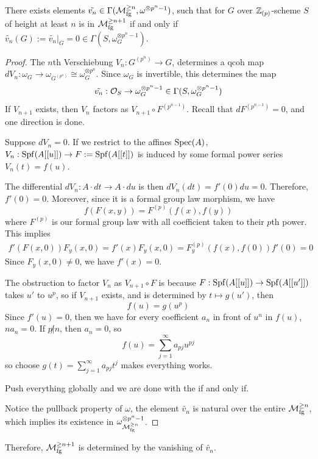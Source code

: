 \begin{proposition}
    There exists elements $\tilde{v_n}\in \Gamma(\mathcal{M}_{\mathrm{fg}}^{\geq n}, \omega^{\otimes p^n-1})$,
    such that for $G$ over $\mathbb{Z}_{(p)}$-scheme $S$ of height at least $n$ is in $\mathcal{M}_{\mathrm{fg}}^{\geq n+1}$ if and only if $\tilde{v_n}(G):=\tilde{v_n}|_{G}=0\in \Gamma(S, \omega_G^{\otimes p^n-1})$.
\end{proposition}
\begin{proof}
The $n$th Verschiebung $V_n: G^{(p^n)}\to G$, determines a qcoh map $dV_n: \omega_G\to \omega_{G^{(p^n)}}\cong \omega_G^{\otimes p^n}$. Since $\omega_G$ is invertible, this determines the map 
\[
\tilde{v_n}: \mathcal{O}_S\to \omega_G^{\otimes p^n-1}\in \Gamma(S, \omega_G^{\otimes p^n-1})
\]
If $V_{n+1}$ exists, then $V_n$ factors as $V_{n+1}\circ F^{(p^{n-1})}$. Recall that $dF^{(p^{n-1})}=0$, and one direction is done.

Suppose $dV_n=0$. If we restrict to the affines $\operatorname{\mathrm{Spec}}(A)$, $V_n: \operatorname{\mathrm{Spf}}(A[[u]])\to F:=\operatorname{\mathrm{Spf}}(A[[t]])$ is induced by some formal power series $V_n(t)=f(u)$.

The differential $dV_n: A\cdot dt\to A\cdot du$ is then $dV_n(dt)= f'(0)du=0$. Therefore, $f'(0)=0$. Moreover, since it is a formal group law morphism, we have
\[
    f(F(x,y))=F^{(p)}(f(x),f(y))
\]where $F^{(p)}$ is our formal group law with all coefficient taken to their $p$th power.
This implies
\begin{align*}
    f'(F(x,0))F_y(x,0)=f'(x)F_y(x,0)=F^{(p)}_y(f(x),f(0))f'(0)=0
\end{align*}Since $F_y(x,0)\neq 0$, we have $f'(x)=0$.

The obstruction to factor $V_n$ as $V_{n+1}\circ F$ is because $F: \operatorname{\mathrm{Spf}}(A[[u]])\to  \operatorname{\mathrm{Spf}}(A[[u']]) $ takes $u'$ to $u^p$, so if $V_{n+1}$ exists, and is determined by $t\mapsto g(u')$, then
\[
f(u)=g(u^p)
\]Since $f'(u)=0$, then we have for every coefficient $a_n$ in front of $u^n$ in $f(u)$, $na_n=0$. If $p\not | n$, then $a_n=0$, so
\[
    f(u)=\sum_{j=1}^\infty a_{pj}u^{pj}
\]so choose $g(t)=\sum_{j=1}^\infty a_{pj}t^{j}$ makes everything works.

Push everything globally and we are done with the if and only if.

Notice the pullback property of $\omega$, the element $\tilde{v_n}$ is natural over the entire $\mathcal{M}_{\mathrm{fg}}^{\geq n}$, which implies its existence in $\omega_{\mathcal{M}_{\mathrm{fg}}^{\geq n}}^{\otimes p^n-1}$.
\end{proof}

Therefore, $\mathcal{M}_{\mathrm{fg}}^{\geq n+1}$ is determined by the vanishing of $\tilde{v_n}$.

